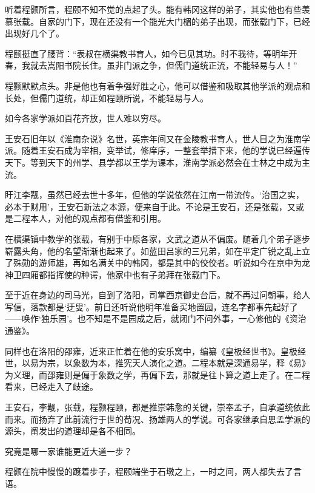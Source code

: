 听着程颢所言，程颐不知不觉的点起了头。能有韩冈这样的弟子，其实他也有些羡慕张载。自家的门下，现在还没有一个能光大门楣的弟子出现，而张载门下，已经出现好几个了。

程颐挺直了腰背：“表叔在横渠教书育人，如今已见其功。时不我待，等明年开春，我就去嵩阳书院长住。虽非门派之争，但儒门道统正流，不能轻易与人！”

程颢默默点头。非是他也有着争强好胜之心，他可以借鉴和吸取其他学派的观点和长处，但儒门道统，却正如程颐所说，不能轻易与人。

如今各家学派如百花齐放，世人难以穷尽。

王安石旧年以《淮南杂说》名世，英宗年间又在金陵教书育人，世人目之为淮南学派。随着王安石成为宰相，变举试，修庠序，一整套举措下来，他的学说已经遍传天下。等到天下的州学、县学都以王学为课本，淮南学派必然会在士林之中成为主流。

盱江李觏，虽然已经去世十多年，但他的学说依然在江南一带流传。‘治国之实，必本于财用’，王安石新法之本源，便来自于此。不论是王安石，还是张载，又或是二程本人，对他的观点都有借鉴和引用。

在横渠镇中教学的张载，有别于中原各家，文武之道从不偏废。随着几个弟子逐步崭露头角，他的名望渐渐也起来了。如蓝田吕家的三兄弟，如在平定广锐之乱上立了殊勋的游师雄，再如名满关中的韩冈，都是其中的佼佼者。听说如今在京中为龙神卫四厢都指挥使的种谔，他家中也有子弟拜在张载门下。

至于近在身边的司马光，自到了洛阳，司掌西京御史台后，就不再过问朝事，给人写信，落款都是‘迂叟’。前日还听说他明年准备买地置园，连名字都事先起好了——唤作‘独乐园’。也不知是不是园成之后，就闭门不问外事，一心修他的《资治通鉴》。

同样也在洛阳的邵雍，近来正忙着在他的安乐窝中，编纂《皇极经世书》。皇极经世，以易为宗，以象数为本，推究天人演化之道。二程本就是深通易学，释《易》为义理，而邵雍则是偏于象数之学，再偏下去，那就是往卜算之道上走了。在二程看来，已经走入了歧途。

王安石，李觏，张载，程颢程颐，都是推崇韩愈的关键，崇奉孟子，自承道统依此而来。而扬弃了此前流行于世的荀况、扬雄两人的学说。可各家继承自思孟学派的源头，阐发出的道理却是各不相同。

究竟是哪一家谁能更近大道一步？

程颢在院中慢慢的踱着步子，程颐端坐于石墩之上，一时之间，两人都失去了言语。

